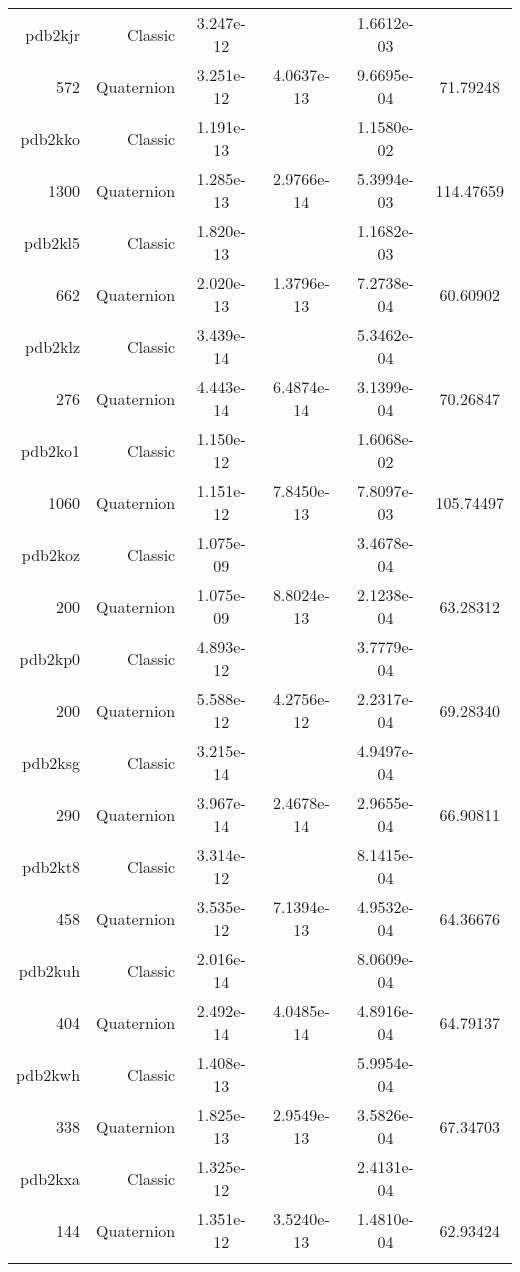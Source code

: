 \begin{xltabular}{\textwidth}{r|rS[table-format=1.3e+2]S[table-format=1.4e+2]S[table-format=1.4e+2]S[table-format=-1.5]}
pdb2kjr & Classic & 3.247e-12 &  & 1.6612e-03 & \\
572 & Quaternion & 3.251e-12 & 4.0637e-13 & 9.6695e-04 & 71.79248\\  \addlinespace
pdb2kko & Classic & 1.191e-13 &  & 1.1580e-02 & \\
1300 & Quaternion & 1.285e-13 & 2.9766e-14 & 5.3994e-03 & 114.47659\\  \addlinespace
pdb2kl5 & Classic & 1.820e-13 &  & 1.1682e-03 & \\
662 & Quaternion & 2.020e-13 & 1.3796e-13 & 7.2738e-04 & 60.60902\\  \addlinespace
pdb2klz & Classic & 3.439e-14 &  & 5.3462e-04 & \\
276 & Quaternion & 4.443e-14 & 6.4874e-14 & 3.1399e-04 & 70.26847\\  \addlinespace
pdb2ko1 & Classic & 1.150e-12 &  & 1.6068e-02 & \\
1060 & Quaternion & 1.151e-12 & 7.8450e-13 & 7.8097e-03 & 105.74497\\  \addlinespace
pdb2koz & Classic & 1.075e-09 &  & 3.4678e-04 & \\
200 & Quaternion & 1.075e-09 & 8.8024e-13 & 2.1238e-04 & 63.28312\\  \addlinespace
pdb2kp0 & Classic & 4.893e-12 &  & 3.7779e-04 & \\
200 & Quaternion & 5.588e-12 & 4.2756e-12 & 2.2317e-04 & 69.28340\\  \addlinespace
pdb2ksg & Classic & 3.215e-14 &  & 4.9497e-04 & \\
290 & Quaternion & 3.967e-14 & 2.4678e-14 & 2.9655e-04 & 66.90811\\  \addlinespace
pdb2kt8 & Classic & 3.314e-12 &  & 8.1415e-04 & \\
458 & Quaternion & 3.535e-12 & 7.1394e-13 & 4.9532e-04 & 64.36676\\  \addlinespace
pdb2kuh & Classic & 2.016e-14 &  & 8.0609e-04 & \\
404 & Quaternion & 2.492e-14 & 4.0485e-14 & 4.8916e-04 & 64.79137\\  \addlinespace
pdb2kwh & Classic & 1.408e-13 &  & 5.9954e-04 & \\
338 & Quaternion & 1.825e-13 & 2.9549e-13 & 3.5826e-04 & 67.34703\\  \addlinespace
pdb2kxa & Classic & 1.325e-12 &  & 2.4131e-04 & \\
144 & Quaternion & 1.351e-12 & 3.5240e-13 & 1.4810e-04 & 62.93424\\  \addlinespace

\end{xltabular}
